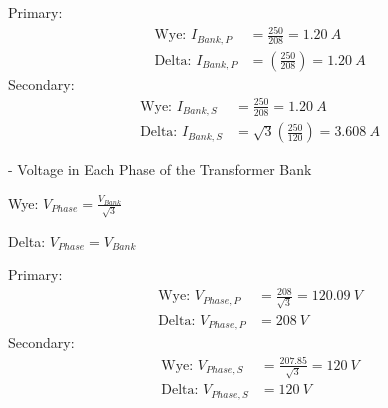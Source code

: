 \begin{description}
\begin{description}
	      \begin{center}
		      Primary:
		      \begin{align*}
			      \text{Wye: } I_{Bank,P}   & = \frac{250}{208} = 1.20 \ A              \\
			      \text{Delta: } I_{Bank,P} & = \left(\frac{250}{208}\right) = 1.20 \ A
		      \end{align*}
		      Secondary:
		      \begin{align*}
			      \text{Wye: } I_{Bank,S}   & = \frac{250}{208} = 1.20 \ A                       \\
			      \text{Delta: } I_{Bank,S} & = \sqrt{3}\left(\frac{250}{120}\right) = 3.608 \ A
		      \end{align*}
	      \end{center}

	\item[$V_{Phase}$] - Voltage in Each Phase of the Transformer Bank
	      \begin{center}
		      Wye: $V_{Phase} = \frac{V_{Bank}}{\sqrt{3}}$
	      \end{center}
	      \begin{center}
		      Delta: $V_{Phase} = V_{Bank}$
	      \end{center}


	      \begin{center}
		      Primary:
		      \begin{align*}
			      \text{Wye: } V_{Phase,P}   & = \frac{208}{\sqrt{3}} = 120.09 \ V \\
			      \text{Delta: } V_{Phase,P} & = 208 \ V
		      \end{align*}
		      Secondary:
		      \begin{align*}
			      \text{Wye: } V_{Phase,S}   & = \frac{207.85}{\sqrt{3}} = 120 \ V \\
			      \text{Delta: } V_{Phase,S} & = 120 \ V
		      \end{align*}
	      \end{center}


\end{description}
\end{description}

